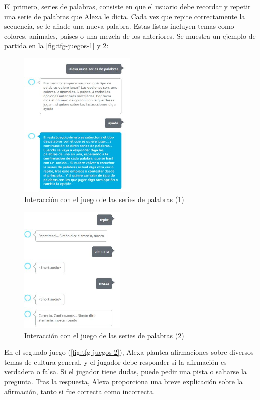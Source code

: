 El primero, series de palabras, consiste en que el usuario debe recordar y repetir una serie de palabras que Alexa le dicta. Cada vez que repite correctamente la secuencia, se le añade una nueva palabra. Estas listas incluyen temas como colores, animales, países o una mezcla de los anteriores. Se muestra un ejemplo de partida en la \autoref{fig:tfg-juegos-1} y \ref{fig:tfg-juegos-11}: 

\begin{figure}[H]
	\centering
	\includegraphics[width=0.5\textwidth]{imgs/tfg-juegos-1.JPG}
	\caption{Interacción con el juego de las series de palabras (1)}
	\label{fig:tfg-juegos-1}
\end{figure}

\begin{figure}[H]
	\centering
	\includegraphics[width=0.45\textwidth]{imgs/tfg-juegos-11.JPG}
	\caption{Interacción con el juego de las series de palabras (2)}
	\label{fig:tfg-juegos-11}
\end{figure}

En el segundo juego (\autoref{fig:tfg-juegos-2}), Alexa plantea afirmaciones sobre diversos temas de cultura general, y el jugador debe responder si la afirmación es verdadera o falsa. Si el jugador tiene dudas, puede pedir una pista o saltarse la pregunta. Tras la respuesta, Alexa proporciona una breve explicación sobre la afirmación, tanto si fue correcta como incorrecta.

